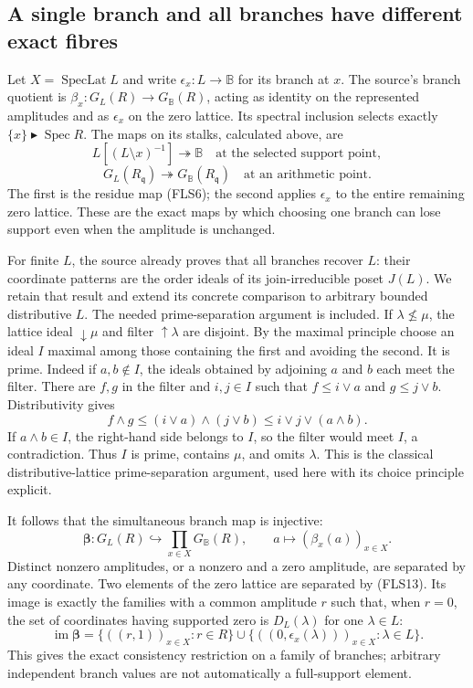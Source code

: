 \documentclass[11pt]{article}
\begin{document}
\subsection{A single branch and all branches have different exact fibres}

Let $X=\operatorname{SpecLat}L$ and write
$\epsilon_x:L\to\mathbb B$ for its branch at $x$.
The source's branch quotient is
$\beta_x:G_L(R)\to G_{\mathbb B}(R)$, acting as identity
on the represented amplitudes and as $\epsilon_x$ on the
zero lattice. Its spectral inclusion selects exactly
$\{x\}\blacktriangleright\operatorname{Spec}R$.
The maps on its stalks, calculated above, are
\[
L[(L\setminus x)^{-1}]\twoheadrightarrow\mathbb B
\quad\text{at the selected support point},
\]
\[
G_L(R_{\mathfrak q})\twoheadrightarrow G_{\mathbb B}(R_{\mathfrak q})
\quad\text{at an arithmetic point}.
\tag{FLS12}
\]
The first is the residue map (FLS6); the second applies
$\epsilon_x$ to the entire remaining zero lattice. These
are the exact maps by which choosing one branch can lose
support even when the amplitude is unchanged.

For finite $L$, the source already proves that all branches
recover $L$: their coordinate patterns are the order ideals
of its join-irreducible poset $J(L)$. We retain that result
and extend its concrete comparison to arbitrary bounded
distributive $L$. The needed prime-separation argument is
included. If $\lambda\nleq\mu$, the lattice ideal
$\downarrow\mu$ and filter $\uparrow\lambda$ are disjoint.
By the maximal principle choose an ideal $I$ maximal among
those containing the first and avoiding the second. It is
prime. Indeed if $a,b\notin I$, the ideals obtained by
adjoining $a$ and $b$ each meet the filter. There are
$f,g$ in the filter and $i,j\in I$ such that
$f\leq i\vee a$ and $g\leq j\vee b$. Distributivity gives
\[
f\wedge g\leq(i\vee a)\wedge(j\vee b)
\leq i\vee j\vee(a\wedge b).
\tag{FLS13}
\]
If $a\wedge b\in I$, the right-hand side belongs to $I$,
so the filter would meet $I$, a contradiction. Thus $I$
is prime, contains $\mu$, and omits $\lambda$. This is
the classical distributive-lattice prime-separation
argument, used here with its choice principle explicit.

It follows that the simultaneous branch map is injective:
\[
\boldsymbol\beta:G_L(R)\hookrightarrow
\prod_{x\in X}G_{\mathbb B}(R),
\qquad a\longmapsto(\beta_x(a))_{x\in X}.
\tag{FLS14}
\]
Distinct nonzero amplitudes, or a nonzero and a zero
amplitude, are separated by any coordinate. Two elements
of the zero lattice are separated by (FLS13). Its image
is exactly the families with a common amplitude $r$ such
that, when $r=0$, the set of coordinates having supported
zero is $D_L(\lambda)$ for one $\lambda\in L$:
\[
\operatorname{im}\boldsymbol\beta
=\{((r,1))_{x\in X}:r\in R\}
\cup\{((0,\epsilon_x(\lambda)))_{x\in X}:\lambda\in L\}.
\tag{FLS15}
\]
This gives the exact consistency restriction on a family
of branches; arbitrary independent branch values are not
automatically a full-support element.
\end{document}
